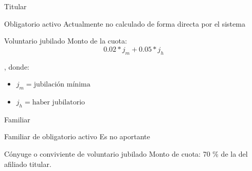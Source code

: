 \documentclass[10pt]{beamer}
\begin{document}
\begin{frame}{Titular}
    \begin{block}{Obligatorio activo}
        Actualmente no calculado de forma directa por el sistema
    \end{block}
    \begin{block}{Voluntario jubilado}
        Monto de la cuota:
        \begin{displaymath}
        0.02 * j_m + 0.05 * j_h
        \end{displaymath}

        , donde:
        \begin{itemize}
            \item $j_m = \text{jubilación mínima}$
            \item $j_h = \text{haber jubilatorio}$
        \end{itemize}
    \end{block}
\end{frame}
\begin{comment}
Los titulares, a su vez, se dividen en:
- Obligatorio activo: agentes que se encuentren en actividad, como docentes, por ejemplos.
    Actualmente, no calculado de forma directa por el sistema, con lo cual queda fuera del alcance de este trabajo.
- Jubilados voluntarios: previamente obligatorios activos que optan por continuar estando afiliados.
Su cuota está calculada por la fórmula (fórmula en la diapositiva.)

Dos consideraciones adicionales que se extrajeron del código fuente del sistema, es que en caso de que dos afiliados voluntarios jubilados tengan registrado un vínculo de cónyuge, se aplica un descuento de 30%

En caso de no tener un haber jubilatorio, en lugar de utilizarse la fórmula mostrada, se utiliza valor de referencia
\end{comment}

\begin{frame}{Familiar}
    \begin{block}{Familiar de obligatorio activo}
        Es no aportante
    \end{block}
    \begin{block}{Cónyuge o conviviente de voluntario jubilado}
        Monto de cuota:  70 \% de la del afiliado titular.
    \end{block}
\end{frame}
\begin{comment}
Como se mencionó antes, los afiliados de esta categoría son familiares de afiliados titulares, distinguiéndose entre
- Familiar de obligatorio activo: son no aportantes, es decir que su cuota es 0.
- Cónyuge o conviviente de voluntario jubilado: su cuota es (fórmula en la slide).
\end{comment}
\end{document}
